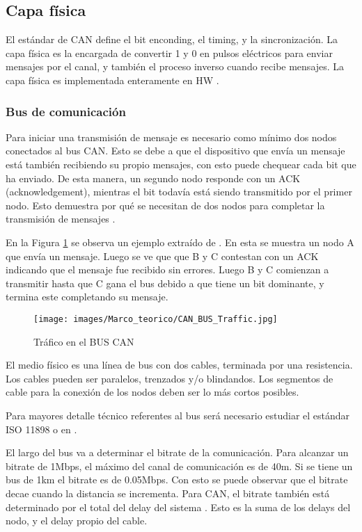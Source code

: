 \subsection{Capa física}\label{subsec:capafisca}
El estándar de CAN define el bit enconding, el timing, y la sincronización. La capa física es la encargada de convertir 1 y 0 en pulsos eléctricos para enviar mensajes por el canal, y también el proceso inverso cuando recibe mensajes. La capa física es implementada enteramente en \ac{HW} \citep{texasFISICACAN}.

\subsubsection{Bus de comunicación}
Para iniciar una transmisión de mensaje es necesario como mínimo dos nodos conectados al bus CAN. Esto se debe a que el dispositivo que envía un mensaje está también recibiendo su propio mensajes, con esto puede chequear cada bit que ha enviado. De esta manera, un segundo nodo responde con un ACK (acknowledgement), mientras el bit todavía está siendo transmitido por el primer nodo. Esto demuestra por qué se necesitan de dos nodos para completar la transmisión de mensajes \citep{texasFISICACAN}.

En la Figura \ref{fig:traficBUSCAN} se observa un ejemplo extraído de \cite{texasFISICACAN}. En esta se muestra un nodo A que envía un mensaje. Luego se ve que que B y C contestan con un ACK indicando que el mensaje fue recibido sin errores. Luego B y C comienzan a transmitir hasta que C gana el bus debido a que tiene un bit dominante, y termina este completando su mensaje.

\begin{figure}[h]
 \centering
 \texttt{[image: images/Marco\_teorico/CAN\_BUS\_Traffic.jpg]}
  \caption{Tráfico en el BUS CAN}
\label{fig:traficBUSCAN}
\end{figure}

El medio físico  es una línea de bus con dos cables, terminada por una resistencia. Los cables pueden ser paralelos, trenzados y/o blindandos. Los segmentos de cable para la conexión de los nodos deben ser lo más cortos posibles.

Para mayores detalle técnico referentes al bus será necesario estudiar el estándar ISO 11898 o en \cite{texasFISICACAN}.

El largo del bus va a determinar el bitrate de la comunicación. Para alcanzar un bitrate de 1Mbps, el máximo del canal de comunicación es de 40m. Si se tiene un bus de 1km el bitrate es de 0.05Mbps. Con esto se puede observar que el bitrate decae cuando la distancia se incrementa. Para CAN, el bitrate también está determinado por el total del delay del sistema \citep{texasFISICACAN}. Esto es la suma de los delays del nodo, y el delay propio del cable.

